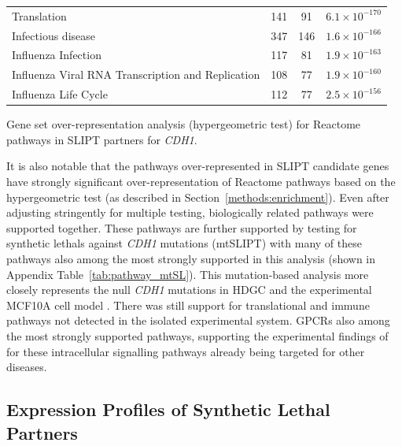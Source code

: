 \begin{table}[!ht]
{\begin{threeparttable}
\begin{tabular}{lccc}
  \rowcolor{black!5}
  Translation & 141 &  91 & $6.1 \times 10^{-170}$ \\ 
  \rowcolor{black!10}
  Infectious disease & 347 & 146 & $1.6 \times 10^{-166}$ \\ 
  \rowcolor{black!5}
  Influenza Infection & 117 &  81 & $1.9 \times 10^{-163}$ \\ 
  \rowcolor{black!10}
  Influenza Viral \acrshort{RNA} Transcription and Replication & 108 &  77 & $1.9 \times 10^{-160}$ \\ 
  \rowcolor{black!5}
  Influenza Life Cycle & 112 &  77 & $2.5 \times 10^{-156}$ \\ 
   \hline
\end{tabular}
\begin{tablenotes}
\raggedright \small
Gene set over-representation analysis (hypergeometric test) for Reactome \glspl{pathway} in \gls{SLIPT} partners for \textit{CDH1}.
\end{tablenotes}
\end{threeparttable}
}
\end{table}

It is also notable that the \glspl{pathway} over-represented in \gls{SLIPT} candidate genes have strongly significant over-representation of Reactome \glspl{pathway} based on the hypergeometric test (as described in Section~\ref{methods:enrichment}). Even after adjusting stringently for multiple testing, biologically related \glspl{pathway} were supported together. These \glspl{pathway} are further supported by testing for \glspl{synthetic lethal} against \textit{CDH1} \glspl{mutation} (\acrshort{mtSLIPT}) with many of these \glspl{pathway} also among the most strongly supported in this analysis (shown in Appendix Table~\ref{tab:pathway_mtSL}). This \gls{mutation}-based analysis more closely represents the null \textit{CDH1} \glspl{mutation} in \gls{HDGC} \citep{Guilford1998} and the experimental MCF10A cell model \citep{Chen2014}. There was still support for translational and immune \glspl{pathway} not detected in the isolated experimental system.  \glspl{GPCR} also among the most strongly supported \glspl{pathway}, supporting the experimental findings of \citet{Telford2015} for these intracellular signalling \glspl{pathway} already being targeted for other diseases. 


\FloatBarrier


\subsection{Expression Profiles of Synthetic Lethal Partners} \label{chapt3:exprSL_clusters}


